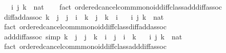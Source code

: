 \begin{isabellebody}
\ \ \ i\ j\ k\ {\isacharcolon}{\kern0pt}{\isacharcolon}{\kern0pt}\ nat\isanewline
%
\isadelimproof
\ \ %
\endisadelimproof
%
\isatagproof
{}\isamarkupfalse%
\ {\isacharparenleft}{\kern0pt}fact\ ordered{\isacharunderscore}{\kern0pt}cancel{\isacharunderscore}{\kern0pt}comm{\isacharunderscore}{\kern0pt}monoid{\isacharunderscore}{\kern0pt}diff{\isacharunderscore}{\kern0pt}class{\isachardot}{\kern0pt}add{\isacharunderscore}{\kern0pt}diff{\isacharunderscore}{\kern0pt}assoc{\isacharparenright}{\kern0pt}%
\endisatagproof
{\isafoldproof}%
%
\isadelimproof
\isanewline
%
\endisadelimproof
\isanewline
{}\isamarkupfalse%
\ diff{\isacharunderscore}{\kern0pt}add{\isacharunderscore}{\kern0pt}assoc{}{\isacharcolon}{\kern0pt}\ {\isachardoublequoteopen}k\ {\isasymle}\ j\ {\isasymLongrightarrow}\ {\isacharparenleft}{\kern0pt}j\ {\isacharplus}{\kern0pt}\ i{\isacharparenright}{\kern0pt}\ {\isacharminus}{\kern0pt}\ k\ {\isacharequal}{\kern0pt}\ {\isacharparenleft}{\kern0pt}j\ {\isacharminus}{\kern0pt}\ k{\isacharparenright}{\kern0pt}\ {\isacharplus}{\kern0pt}\ i{\isachardoublequoteclose}\isanewline
\ \ \ i\ j\ k\ {\isacharcolon}{\kern0pt}{\isacharcolon}{\kern0pt}\ nat\isanewline
%
\isadelimproof
\ \ %
\endisadelimproof
%
\isatagproof
{}\isamarkupfalse%
\ {\isacharparenleft}{\kern0pt}fact\ ordered{\isacharunderscore}{\kern0pt}cancel{\isacharunderscore}{\kern0pt}comm{\isacharunderscore}{\kern0pt}monoid{\isacharunderscore}{\kern0pt}diff{\isacharunderscore}{\kern0pt}class{\isachardot}{\kern0pt}diff{\isacharunderscore}{\kern0pt}add{\isacharunderscore}{\kern0pt}assoc{}{\isacharparenright}{\kern0pt}%
\endisatagproof
{\isafoldproof}%
%
\isadelimproof
\isanewline
%
\endisadelimproof
\isanewline
{}\isamarkupfalse%
\ add{\isacharunderscore}{\kern0pt}diff{\isacharunderscore}{\kern0pt}assoc{}\ {\isacharbrackleft}{\kern0pt}simp{\isacharbrackright}{\kern0pt}{\isacharcolon}{\kern0pt}\ {\isachardoublequoteopen}k\ {\isasymle}\ j\ {\isasymLongrightarrow}\ j\ {\isacharminus}{\kern0pt}\ k\ {\isacharplus}{\kern0pt}\ i\ {\isacharequal}{\kern0pt}\ j\ {\isacharplus}{\kern0pt}\ i\ {\isacharminus}{\kern0pt}\ k{\isachardoublequoteclose}\isanewline
\ \ \ i\ j\ k\ {\isacharcolon}{\kern0pt}{\isacharcolon}{\kern0pt}\ nat\isanewline
%
\isadelimproof
\ \ %
\endisadelimproof
%
\isatagproof
{}\isamarkupfalse%
\ {\isacharparenleft}{\kern0pt}fact\ ordered{\isacharunderscore}{\kern0pt}cancel{\isacharunderscore}{\kern0pt}comm{\isacharunderscore}{\kern0pt}monoid{\isacharunderscore}{\kern0pt}diff{\isacharunderscore}{\kern0pt}class{\isachardot}{\kern0pt}add{\isacharunderscore}{\kern0pt}diff{\isacharunderscore}{\kern0pt}assoc{}{\isacharparenright}{\kern0pt}%

\end{isabellebody}
